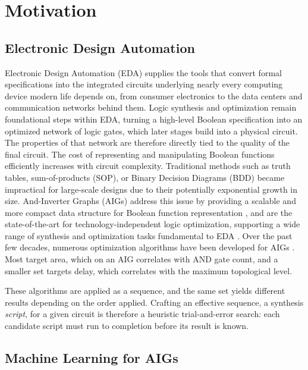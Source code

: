 \section{Motivation}
\label{sec:intro:motivation}
\subsection{Electronic Design Automation}
\label{sec:intro:motivation:synthesis}
Electronic Design Automation (EDA) supplies the tools that convert formal specifications
into the integrated circuits underlying nearly every computing device modern life depends on,
from consumer electronics to the data centers and communication networks behind them. Logic
synthesis and optimization remain foundational steps within EDA, turning a high-level Boolean
specification into an optimized network of logic gates, which later stages build into a
physical circuit. The properties of that network are therefore directly tied to the quality
of the final circuit. The cost of representing and manipulating Boolean functions
efficiently increases with circuit complexity. Traditional methods such as truth tables,
sum-of-products (SOP), or Binary Decision Diagrams (BDD) became impractical for large-scale
designs due to their potentially exponential growth in size. And-Inverter Graphs
(AIGs) address this issue by providing a scalable and more compact data structure for Boolean
function representation \citep{kuehlmann2002robust}, and are the state-of-the-art for
technology-independent logic optimization, supporting a wide range of synthesis and
optimization tasks fundamental to EDA \citep{mishchenko2006rewriting,brayton2010abc}. Over the
past few decades, numerous optimization algorithms have been developed for AIGs
\citep{mishchenko2006rewriting,mishchenko2006scalable,brayton2010abc}. Most target area,
which on an AIG correlates with AND gate count, and a smaller set targets delay, which
correlates with the maximum topological level.

These algorithms are applied as a sequence, and the same set yields different results
depending on the order applied. Crafting an effective sequence, a synthesis \emph{script},
for a given circuit is therefore a heuristic trial-and-error search: each candidate script
must run to completion before its result is known.

\subsection{Machine Learning for AIGs}
\label{sec:intro:motivation:ml}

